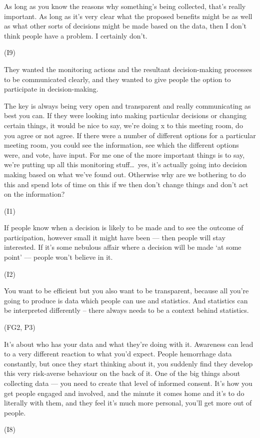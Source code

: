 \begin{qt}As long as you know the reasons why something’s being
  collected, that’s really important. As long as it’s very clear what
  the proposed benefits might be as well as what other sorts of
  decisions might be made based on the data, then I don’t think people
  have a problem. I certainly don’t.\end{qt} (I9)

They wanted the monitoring actions and the resultant decision-making
processes to be communicated clearly, and they wanted to give people
the option to participate in decision-making.

\begin{qt}The key is always being very open and transparent and really
  communicating as best you can. If they were looking into making
  particular decisions or changing certain things, it would be nice to
  say, we’re doing x to this meeting room, do you agree or not
  agree. If there were a number of different options for a particular
  meeting room, you could see the information, see which the different
  options were, and vote, have input. For me one of the more important
  things is to say, we’re putting up all this monitoring stuff\ldots\
  yes, it’s actually going into decision making based on what we’ve
  found out. Otherwise why are we bothering to do this and spend lots
  of time on this if we then don’t change things and don’t act on the
  information?\end{qt} (I1)

\begin{qt}If people know when a decision is likely to be made and to see the
outcome of participation, however small it might have been –-- then
people will stay interested. If it’s some nebulous affair where a
decision will be made ‘at some point’ –-- people won’t believe in it.\end{qt}
(I2)

\begin{qt}You want to be efficient but you also want to be transparent, because
all you’re going to produce is data which people can use and
statistics. And statistics can be interpreted differently – there
always needs to be a context behind statistics.\end{qt} (FG2, P3)

\begin{qt}It’s about who has your data and what they’re doing with
  it. Awareness can lead to a very different reaction to what you’d
  expect. People hemorrhage data constantly, but once they start
  thinking about it, you suddenly find they develop this very
  risk-averse behaviour on the back of it. One of the big things about
  collecting data --– you need to create that level of informed
  consent. It’s how you get people engaged and involved, and the
  minute it comes home and it’s to do literally with them, and they
  feel it’s much more personal, you’ll get more out of people.\end{qt}
(I8)

